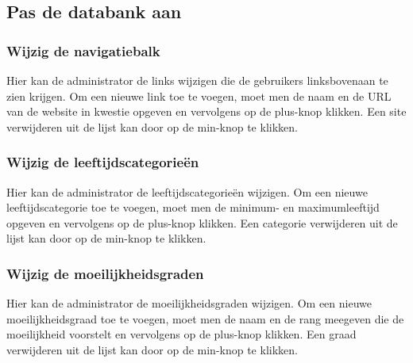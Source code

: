 \documentclass[]{article}
\begin{document}
\subsection{Pas de databank aan}

\subsubsection{Wijzig de navigatiebalk}
Hier kan de administrator de links wijzigen die de gebruikers linksbovenaan te zien krijgen. Om een nieuwe link toe te voegen, moet men de naam en de URL van de website in kwestie opgeven en vervolgens op de plus-knop klikken. Een site verwijderen uit de lijst kan door op de min-knop te klikken.

\subsubsection{Wijzig de leeftijdscategorieën}
Hier kan de administrator de leeftijdscategorieën wijzigen. Om een nieuwe leeftijdscategorie toe te voegen, moet men de minimum- en maximumleeftijd opgeven en vervolgens op de plus-knop klikken. Een categorie verwijderen uit de lijst kan door op de min-knop te klikken.

\subsubsection{Wijzig de moeilijkheidsgraden}
Hier kan de administrator de moeilijkheidsgraden wijzigen. Om een nieuwe moeilijkheidsgraad toe te voegen, moet men de naam en de rang meegeven die de moeilijkheid voorstelt en vervolgens op de plus-knop klikken. Een graad verwijderen uit de lijst kan door op de min-knop te klikken.
\end{document}
